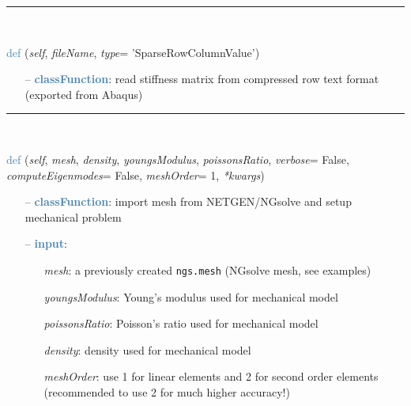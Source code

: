 \begin{itemize}[leftmargin=1.4cm]
\begin{itemize}[leftmargin=1.4cm]
\begin{itemize}[leftmargin=1.4cm]
\begin{itemize}[leftmargin=0.5cm]
\begin{itemize}[leftmargin=1.4cm]
\begin{itemize}[leftmargin=1.4cm]
\begin{itemize}[leftmargin=0.5cm]
%
\noindent\rule{8cm}{0.75pt}\vspace{1pt} \\ 
\begin{flushleft}
\noindent \textcolor{steelblue}{def {\bf {}}}\label{sec:FEM:FEMinterface:ReadStiffnessMatrixFromAbaqus}
({\it self}, {\it fileName}, {\it type}= 'SparseRowColumnValue')
\end{flushleft}
\setlength{\itemindent}{0.7cm}
\begin{itemize}[leftmargin=0.7cm]
\item[--]\textcolor{steelblue}{\bf classFunction}: read stiffness matrix from compressed row text format (exported from Abaqus)
\vspace{12pt}\end{itemize}
%
\noindent\rule{8cm}{0.75pt}\vspace{1pt} \\ 
\begin{flushleft}
\noindent \textcolor{steelblue}{def {\bf {}}}\label{sec:FEM:FEMinterface:ImportMeshFromNGsolve}
({\it self}, {\it mesh}, {\it density}, {\it youngsModulus}, {\it poissonsRatio}, {\it verbose}= False, {\it computeEigenmodes}= False, {\it meshOrder}= 1, {\it **kwargs})
\end{flushleft}
\setlength{\itemindent}{0.7cm}
\begin{itemize}[leftmargin=0.7cm]
\item[--]\textcolor{steelblue}{\bf classFunction}: import mesh from NETGEN/NGsolve and setup mechanical problem
\item[--]\textcolor{steelblue}{\bf input}: \vspace{-6pt}
\begin{itemize}[leftmargin=1.2cm]
\setlength{\itemindent}{-0.7cm}
\item[]{\it mesh}: a previously created \texttt{ngs.mesh} (NGsolve mesh, see examples)
\item[]{\it youngsModulus}: Young's modulus used for mechanical model
\item[]{\it poissonsRatio}: Poisson's ratio used for mechanical model
\item[]{\it density}: density used for mechanical model
\item[]{\it meshOrder}: use 1 for linear elements and 2 for second order elements (recommended to use 2 for much higher accuracy!)

\end{itemize}
\end{itemize}
\end{itemize}
\end{itemize}
\end{itemize}
\end{itemize}
\end{itemize}
\end{itemize}
\end{itemize}
